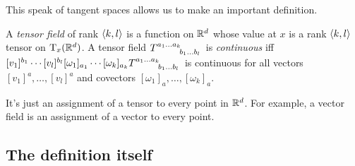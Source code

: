 This speak of tangent spaces allows us to make an important definition.
\begin{dfn}\label{TensorField}
A \emph{tensor field} of rank $\coord{k,l}$ is a function on $\R ^d$ whose value at $x$ is a rank $\coord{k,l}$ tensor on $\tangent{\R ^d}{x}$.  A tensor field $T\indices{^{a_1\ldots a_k}_{b_1\ldots b_l}}$ is \emph{continuous} iff $[v_1]^{b_1}\cdots [v_l]^{b_l}[\omega _1]_{a_1}\cdots [\omega _k]_{a_k}T\indices{^{a_1\ldots a_k}_{b_1\ldots b_l}}$ is continuous for all vectors $[v_1]^a,\ldots ,[v_l]^a$ and covectors $[\omega _1]_a,\ldots ,[\omega _k]_a$.
\begin{rmk}
It's just an assignment of a tensor to every point in $\R ^d$.  For example, a vector field is an assignment of a vector to every point.
\end{rmk}
\end{dfn}

\subsection{The definition itself}

